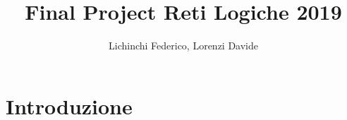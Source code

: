 \documentclass[a4paper,12pt]{article}
\title{Final Project Reti Logiche 2019}
\author{Lichinchi Federico, Lorenzi Davide}
\begin{document}
\maketitle
\newpage
\tableofcontents
\newpage

\section{Introduzione}
\end{document}
